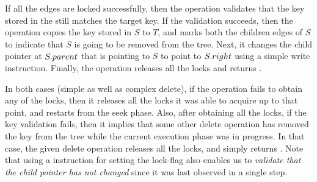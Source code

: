 \begin{enumerate}[label=(\alph*)]


If all the edges are locked successfully, then the operation validates that the key stored in the \targetnode{} still matches the target key. If the validation succeeds, then  the operation copies the key stored in $S$ to $T$, and marks both the children edges of $S$ to indicate that $S$ is going to be removed from the tree. Next, it changes the child pointer at $S.parent$ that is pointing to $S$ to point to $S.right{}$ using a simple write instruction. Finally, the operation releases all the locks and returns \true{}.
\end{enumerate}

In both cases (simple as well as complex delete), if the operation fails to obtain any of the locks, then it releases all the locks it was able to acquire up to that point, and restarts from the seek phase. Also, after obtaining all the locks, if the key validation fails, then it implies that some other delete operation has removed the key from the tree while the current execution phase was in progress. In that case, the given delete operation releases all the locks,  and simply returns \false{}. Note that using a \CAS{} instruction for setting the lock-flag also enables us to \emph{validate that the child pointer has not changed} since it was last observed in a single step.

